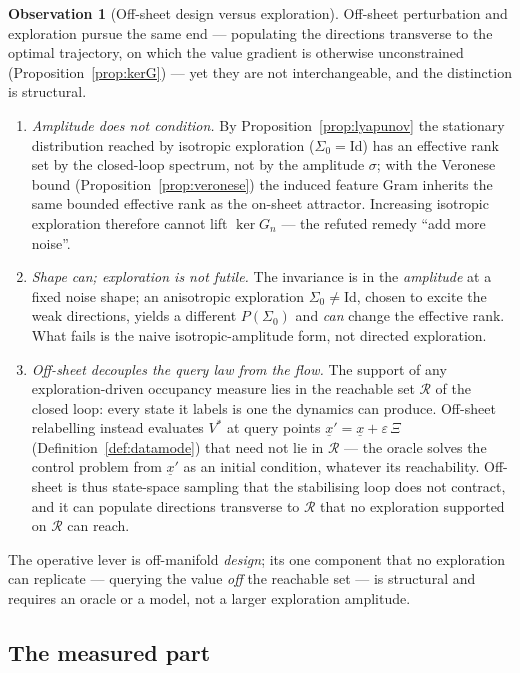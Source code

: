 \documentclass[11pt]{article}
\renewcommand{\_}{\discretionary{\textunderscore}{}{\textunderscore}}
\theoremstyle{plain}
\theoremstyle{definition}
\newtheorem{observation}[theorem]{Observation}
\begin{document}
\begin{observation}[Off-sheet design versus exploration]\label{obs:explore}
Off-sheet perturbation and exploration pursue the same end --- populating the directions transverse
to the optimal trajectory, on which the value gradient is otherwise unconstrained
(Proposition~\ref{prop:kerG}) --- yet they are not interchangeable, and the distinction is
structural.
\begin{enumerate}
\item \emph{Amplitude does not condition.} By Proposition~\ref{prop:lyapunov} the stationary
distribution reached by isotropic exploration ($\Sigma_{0}=\mathrm{Id}$) has an effective rank set by
the closed-loop spectrum, not by the amplitude $\sigma$; with the Veronese bound
(Proposition~\ref{prop:veronese}) the induced feature Gram inherits the same bounded effective rank
as the on-sheet attractor. Increasing isotropic exploration therefore cannot lift $\ker G_{n}$ ---
the refuted remedy ``add more noise''.
\item \emph{Shape can; exploration is not futile.} The invariance is in the \emph{amplitude} at a
fixed noise shape; an anisotropic exploration $\Sigma_{0}\neq\mathrm{Id}$, chosen to excite the weak
directions, yields a different $P(\Sigma_{0})$ and \emph{can} change the effective rank. What fails is
the naive isotropic-amplitude form, not directed exploration.
\item \emph{Off-sheet decouples the query law from the flow.} The support of any exploration-driven
occupancy measure lies in the reachable set $\mathcal R$ of the closed loop: every state it labels is
one the dynamics can produce. Off-sheet relabelling instead evaluates $V^{\ast}$ at query points
$\underline x'=\underline x+\varepsilon\,\Xi$ (Definition~\ref{def:datamode}) that need not lie in
$\mathcal R$ --- the oracle solves the control problem from $\underline x'$ as an initial condition,
whatever its reachability. Off-sheet is thus state-space sampling that the stabilising loop does not
contract, and it can populate directions transverse to $\mathcal R$ that no exploration supported on
$\mathcal R$ can reach.
\end{enumerate}
The operative lever is off-manifold \emph{design}; its one component that no exploration can
replicate --- querying the value \emph{off} the reachable set --- is structural and requires an
oracle or a model, not a larger exploration amplitude.
\end{observation}

\subsection{The measured part}
\end{document}
